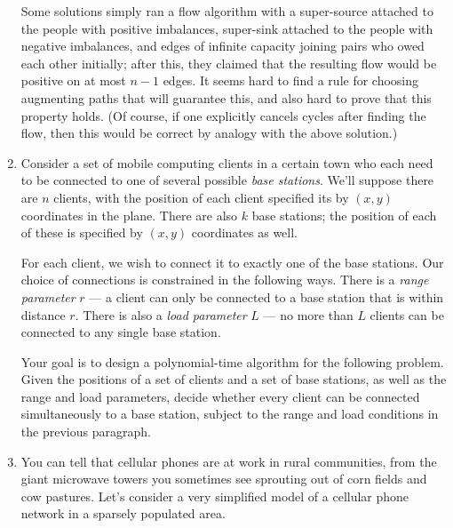 \documentclass[12pt]{article}
\begin{document}
\begin{enumerate}
{Some solutions simply ran a flow algorithm with
a super-source attached to the people with positive 
imbalances, super-sink attached to the people with negative imbalances,
and edges of infinite capacity joining pairs who owed each other initially;
after this, they claimed that the resulting flow would be
positive on at most $n-1$ edges.
It seems hard to find a rule for choosing augmenting paths that
will guarantee this, and also hard to prove that this property holds.
(Of course, if one explicitly cancels cycles after finding
the flow, then this would be correct by analogy with the above solution.)

}

\item 


Consider a set of mobile computing clients
in a certain town
who each need to be connected to one of several
possible {\em base stations}.
We'll suppose there are $n$ clients, with
the position of each client specified its by $(x,y)$
coordinates in the plane.
There are also $k$ base stations; the position of
each of these is specified by $(x,y)$ coordinates as well.

For each client, we wish to connect it to exactly one of the base stations.
Our choice of connections is constrained in the following ways.
There is a {\em range parameter} $r$ --- a client
can only be connected to a base station that is within distance $r$.
There is also a {\em load parameter} $L$ --- no more
than $L$ clients can be connected to any single base station.

Your goal is to design a polynomial-time algorithm for the
following problem.
Given the positions of a set of clients and a set of base
stations, as well as the range and load parameters,
decide whether every client can be connected
simultaneously to a base station,
subject to the range and load conditions in the previous paragraph.




\item 

You can tell that cellular phones are at work in rural communities,
from the giant microwave towers you sometimes see sprouting out
of corn fields and cow pastures.
Let's consider a very simplified model of a cellular phone network
in a sparsely populated area.


\end{enumerate}
\end{document}
